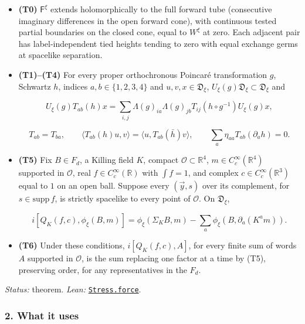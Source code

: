 \documentclass[
  letterpaper,
  11pt]{article}
\begin{document}
\begin{itemize}
\item
  \textbf{(T0)} \(\mathsf F^\xi\) extends holomorphically to the full
  forward tube (consecutive imaginary differences in the open forward
  cone), with continuous tested partial boundaries on the closed cone,
  equal to \(W^\xi\) at zero. Each adjacent pair has label-independent
  tied heights tending to zero with equal exchange germs at spacelike
  separation.
\item
  \textbf{(T1)--(T4)} For every proper orthochronous Poincaré
  transformation \(g\), Schwartz \(h\), indices \(a,b\in\{1,2,3,4\}\)
  and \(u,v,x\in\mathfrak D_\xi\),
  \(U_\xi(g)\mathfrak D_\xi\subset\mathfrak D_\xi\) and

  \[U_\xi(g)T_{ab}(h)x=\sum_{i,j}\Lambda(g)_{ia}\Lambda(g)_{jb}T_{ij}(h\circ g^{-1})U_\xi(g)x,\]

  \[T_{ab}=T_{ba},\qquad \langle T_{ab}(h)u,v\rangle=\langle u,T_{ab}(\bar h)v\rangle,\qquad \sum_a\eta_{aa}T_{ab}(\partial_ah)=0.\]
\item
  \textbf{(T5)} Fix \(B\in F_d\), a Killing field \(K\), compact
  \(\mathcal O\subset\mathbb R^4\), \(m\in C_c^\infty(\mathbb R^4)\)
  supported in \(\mathcal O\), real \(f\in C_c^\infty(\mathbb R)\) with
  \(\int f=1\), and complex \(c\in C_c^\infty(\mathbb R^3)\) equal to
  \(1\) on an open ball. Suppose every \((\vec y,s)\) over its
  complement, for \(s\in\mathrm{supp}\,f\), is strictly spacelike to
  every point of \(\mathcal O\). On \(\mathfrak D_\xi\),

  \[i[Q_K(f,c),\phi_\xi(B,m)]=\phi_\xi(\Sigma_KB,m)-\sum_a\phi_\xi(B,\partial_a(K^am)).\]
\item
  \textbf{(T6)} Under these conditions, \(i[Q_K(f,c),A]\), for every
  finite sum of words \(A\) supported in \(\mathcal O\), is the sum
  replacing one factor at a time by (T5), preserving order, for any
  representatives in the \(F_d\).
\end{itemize}

\emph{Status:} theorem. \emph{Lean:}
\href{https://github.com/yang-mills-group/OpenAI-YM-20261028/blob/3456e5e75cf8d4cd558955a5c7638fba2d68f464/YM/EveryPhase/Implement.lean\#L94-L116}{\texttt{Stress.force}}.

\subsubsection{2. What it uses}\label{what-it-uses-22}
\end{document}
